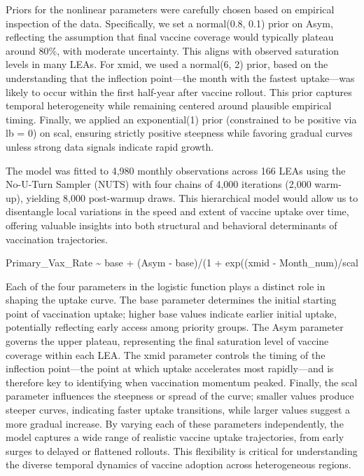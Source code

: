 \documentclass{article}
\begin{document}
Priors for the nonlinear parameters were carefully chosen based on
empirical inspection of the data. Specifically, we set a normal(0.8,
0.1) prior on Asym, reflecting the assumption that final vaccine
coverage would typically plateau around 80\%, with moderate uncertainty.
This aligns with observed saturation levels in many LEAs. For xmid, we
used a normal(6, 2) prior, based on the understanding that the
inflection point---the month with the fastest uptake---was likely to
occur within the first half-year after vaccine rollout. This prior
captures temporal heterogeneity while remaining centered around
plausible empirical timing. Finally, we applied an exponential(1) prior
(constrained to be positive via lb = 0) on scal, ensuring strictly
positive steepness while favoring gradual curves unless strong data
signals indicate rapid growth.

The model was fitted to 4,980 monthly observations across 166 LEAs using
the No-U-Turn Sampler (NUTS) with four chains of 4,000 iterations (2,000
warm-up), yielding 8,000 post-warmup draws. This hierarchical model
would allow us to disentangle local variations in the speed and extent
of vaccine uptake over time, offering valuable insights into both
structural and behavioral determinants of vaccination trajectories.

Primary\_Vax\_Rate \textasciitilde{} base + (Asym - base)/(1 + exp((xmid
- Month\_num)/scal

Each of the four parameters in the logistic function plays a distinct
role in shaping the uptake curve. The base parameter determines the
initial starting point of vaccination uptake; higher base values
indicate earlier initial uptake, potentially reflecting early access
among priority groups. The Asym parameter governs the upper plateau,
representing the final saturation level of vaccine coverage within each
LEA. The xmid parameter controls the timing of the inflection
point---the point at which uptake accelerates most rapidly---and is
therefore key to identifying when vaccination momentum peaked. Finally,
the scal parameter influences the steepness or spread of the curve;
smaller values produce steeper curves, indicating faster uptake
transitions, while larger values suggest a more gradual increase. By
varying each of these parameters independently, the model captures a
wide range of realistic vaccine uptake trajectories, from early surges
to delayed or flattened rollouts. This flexibility is critical for
understanding the diverse temporal dynamics of vaccine adoption across
heterogeneous regions.
\end{document}
